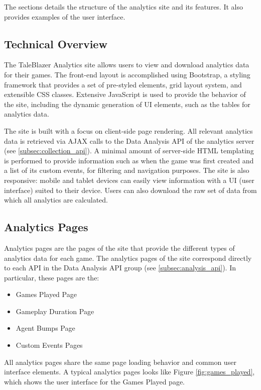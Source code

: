 The sections details the structure of the analytics site and its features. It also provides examples of the user interface. 

\subsection{Technical Overview}

The TaleBlazer Analytics site allows users to view and download analytics data for their games. The front-end layout is accomplished using Bootstrap, a styling framework that provides a set of pre-styled elements, grid layout system, and extensible CSS classes. Extensive JavaScript is used to provide the behavior of the site, including the dynamic generation of UI elements, such as the tables for analytics data. 

The site is built with a focus on client-side page rendering. All relevant analytics data is retrieved via AJAX calls to the Data Analysis API of the analytics server (see \ref{subsec:collection_api}). A minimal amount of server-side HTML templating is performed to provide information such as when the game was first created and a list of its custom events, for filtering and navigation purposes. The site is also responsive: mobile and tablet devices can easily view information with a UI (user interface) suited to their device. Users can also download the raw set of data from which all analytics are calculated.

\subsection{Analytics Pages}

Analytics pages are the pages of the site that provide the different types of analytics data for each game. The analytics pages of the site correspond directly to each API in the Data Analysis API group (see \ref{subsec:analysis_api}). In particular, these pages are the:
	\begin{itemize}
		\item Games Played Page
		\item Gameplay Duration Page
		\item Agent Bumps Page
		\item Custom Events Pages
	\end{itemize}
All analytics pages share the same page loading behavior and common user interface elements. A typical analytics pages looks like Figure \ref{fig:games_played}, which shows the user interface for the Games Played page.

